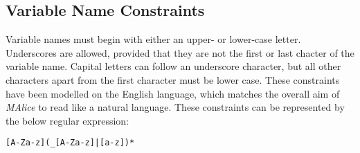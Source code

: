 \documentclass[11pt]{article}
\begin{document}
\subsection*{Variable Name Constraints}
Variable names must begin with either an upper- or lower-case letter. Underscores are allowed, provided that they are not the first or last chacter of the variable name. Capital letters can follow an underscore character, but all other characters apart from the first character must be lower case. These constraints have been modelled on the English language, which matches the overall aim of \emph{MAlice} to read like a natural language. These constraints can be represented by the below regular expression:

\begin{center}
  \texttt{[A-Za-z](_[A-Za-z]|[a-z])*}
\end{center}
\end{document}
